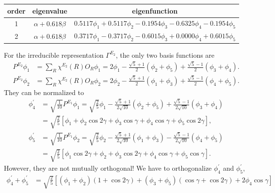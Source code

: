 \documentclass[a4paper]{book}
\begin{document}
\begin{solution}
\begin{enumerate}[label=(\alph*)]
		\begin{center}
		\setlength{\abovecaptionskip}{0em}
		\begin{tabular}{ccc}\hline
		  order	&	eigenvalue		& 	eigenfunction	\\ \hline
			1	&$\alpha+0.618\beta$& 	$0.5117\phi_1 + 0.5117 \phi_2 -0.1954 \phi_3 -0.6325 \phi_4 -0.1954 \phi_5$ \\
			2	&$\alpha+0.618\beta$& 	$0.3717\phi_1 - 0.3717 \phi_2 -0.6015 \phi_3 +0.0000 \phi_4 +0.6015 \phi_5$ \\
			 \hline
		\end{tabular}
		\end{center}
		
		For the irreducible representation $\Gamma^{E_2}$, the only two basis functions are
		\begin{align*}
			P^{E_2}\phi_1 &= \sum_{R} \chi^{E_2}(R) O_R \phi_1 = 2\phi_1 - \frac{\sqrt{5}+1}{2}(\phi_2 + \phi_5) + \frac{\sqrt{5}-1}{2}(\phi_3 + \phi_4). \\
			P^{E_2}\phi_2 &= \sum_{R} \chi^{E_2}(R) O_R \phi_2 = 2\phi_2 - \frac{\sqrt{5}+1}{2}(\phi_1 + \phi_3) + \frac{\sqrt{5}-1}{2}(\phi_4 + \phi_5).
		\end{align*}
		They can be normalized to
		\begin{align*}
			\phi^\prime_4 &= \sqrt{\frac{1}{10}} P^{E_1}\phi_1 = \sqrt{ \frac{2}{5} }\phi_1 - \frac{\sqrt{5}+1}{2\sqrt{10}}(\phi_2+\phi_5) + \frac{\sqrt{5}-1}{2\sqrt{10}}(\phi_3+\phi_4) \\
			&= \sqrt{ \frac{2}{5} } \left[ \phi_1 + \phi_2 \cos2\gamma + \phi_3\cos\gamma + \phi_4\cos\gamma + \phi_5\cos2\gamma \right], \\
			\phi^\prime_5 &= \sqrt{\frac{1}{10}} P^{E_1}\phi_2 = \sqrt{ \frac{2}{5} }\phi_2 - \frac{\sqrt{5}+1}{2\sqrt{10}}(\phi_1+\phi_3) - \frac{\sqrt{5}-1}{2\sqrt{10}}(\phi_4+\phi_5) \\
			&= \sqrt{ \frac{2}{5} } \left[ \phi_1\cos2\gamma + \phi_2  + \phi_3\cos2\gamma + \phi_4\cos\gamma + \phi_5\cos\gamma \right].
		\end{align*}
		However, they are not mutually orthogonal! We have to orthogonalize $\phi^\prime_4$ and $\phi^\prime_5$,
		\begin{align*}
			\phi^\prime_4 + \phi^\prime_5 &= \sqrt{ \frac{2}{5} } \left[ (\phi_1+\phi_2) (1+\cos2\gamma) + (\phi_3+\phi_5) (\cos\gamma + \cos 2\gamma) + 2\phi_4\cos\gamma \right] \\

\end{align*}
\end{enumerate}
\end{solution}
\end{document}
